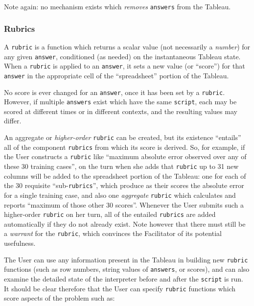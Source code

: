 Note again: no mechanism exists which \emph{removes} \texttt{answers} from the Tableau.

\subsubsection{Rubrics}\hypertarget{rubrics}{}\label{rubrics}

A \texttt{rubric} is a function which returns a scalar value (not necessarily a \emph{number}) for any given \texttt{answer}, conditioned (as needed) on the instantaneous Tableau state. When a \texttt{rubric} is applied to an \texttt{answer}, it sets a new value (or ``score'') for that \texttt{answer} in the appropriate cell of the ``spreadsheet'' portion of the Tableau.

No score is ever changed for an \texttt{answer}, once it has been set by a \texttt{rubric}. However, if multiple \texttt{answers} exist which have the same \texttt{script}, each may be scored at different times or in different contexts, and the resulting values may differ.

An aggregate or \emph{higher-order} \texttt{rubric} can be created, but its existence ``entails'' all of the component \texttt{rubrics} from which its score is derived. So, for example, if the User constructs a \texttt{rubric} like ``maximum absolute error observed over any of these 30 training cases'', on the turn when she adds that \texttt{rubric} up to 31 new columns will be added to the spreadsheet portion of the Tableau: one for each of the 30 requisite ``sub-\texttt{rubrics}'', which produce as their scores the absolute error for a single training case, and also one \emph{aggregate} \texttt{rubric} which calculates and reports ``maximum of those other 30 scores''. Whenever the User submits such a higher-order \texttt{rubric} on her turn, all of the entailed \texttt{rubrics} are added automatically if they do not already exist. Note however that there must still be a \emph{warrant} for the \texttt{rubric}, which convinces the Facilitator of its potential usefulness.

The User can use any information present in the Tableau in building new \texttt{rubric} functions (such as row numbers, string values of \texttt{answers}, or scores), and can also examine the detailed state of the interpreter before and after the \texttt{script} is run. It should be clear therefore that the User can specify \texttt{rubric} functions which score aspects of the problem such as:

